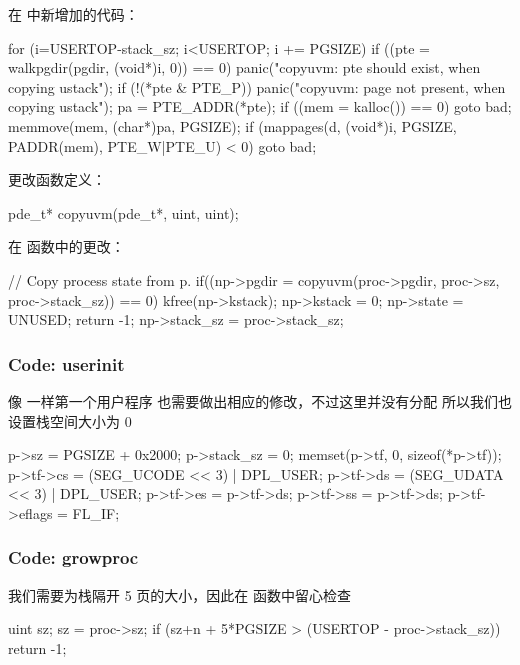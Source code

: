 在  中新增加的代码：

\begin{ccode}
    for (i=USERTOP-stack_sz; i<USERTOP; i += PGSIZE) {
        if ((pte = walkpgdir(pgdir, (void*)i, 0)) == 0)
            panic("copyuvm: pte should exist, when copying ustack");
        if (!(*pte & PTE_P))
            panic("copyuvm: page not present, when copying ustack");
        pa = PTE_ADDR(*pte);
        if ((mem = kalloc()) == 0)
            goto bad;
        memmove(mem, (char*)pa, PGSIZE);
        if (mappages(d, (void*)i, PGSIZE, PADDR(mem), PTE_W|PTE_U) < 0)
            goto bad;
    }
\end{ccode}

更改函数定义：

\begin{ccode}
    pde_t*          copyuvm(pde_t*, uint, uint);
\end{ccode}

在  函数中的更改：

\begin{ccode}
    // Copy process state from p.
    if((np->pgdir = copyuvm(proc->pgdir, proc->sz, proc->stack_sz)) == 0){
        kfree(np->kstack);
        np->kstack = 0;
        np->state = UNUSED;
        return -1;
    }
    np->stack_sz = proc->stack_sz;
\end{ccode}

\subsubsection{Code: userinit}

像  一样第一个用户程序  也需要做出相应的修改，不过这里并没有分配  所以我们也设置栈空间大小为 0

\begin{ccode}
    p->sz = PGSIZE + 0x2000;
    p->stack_sz = 0;
    memset(p->tf, 0, sizeof(*p->tf));
    p->tf->cs = (SEG_UCODE << 3) | DPL_USER;
    p->tf->ds = (SEG_UDATA << 3) | DPL_USER;
    p->tf->es = p->tf->ds;
    p->tf->ss = p->tf->ds;
    p->tf->eflags = FL_IF;
\end{ccode}

\subsubsection{Code: growproc}

我们需要为栈隔开 5 页的大小，因此在  函数中留心检查


\begin{ccode}
    uint sz;
    sz = proc->sz;
    if (sz+n + 5*PGSIZE > (USERTOP - proc->stack_sz))
        return -1;
\end{ccode}

